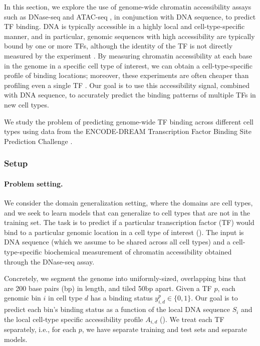 In this section, we explore the use of genome-wide chromatin accessibility assays such as DNase-seq and ATAC-seq \citep{boyle2008high, DNaseLandscape12, ATAC13}, in conjunction with DNA sequence, to predict TF binding.
DNA is typically accessible in a highly local and cell-type-specific manner,
and in particular, genomic sequences with high accessibility are typically bound by one or more TFs, although the identity of the TF is not directly measured by the experiment \citep{lee2004evidence}.
By measuring chromatin accessibility at each base in the genome in a specific cell type of interest, we can obtain a cell-type-specific profile of binding locations; moreover, these experiments are often cheaper than profiling even a single TF \citep{minnoye2021chromatin}.
Our goal is to use this accessibility signal, combined with DNA sequence, to accurately predict the binding patterns of multiple TFs in new cell types.

We study the problem of predicting genome-wide TF binding across different cell types using data from the ENCODE-DREAM Transcription Factor Binding Site Prediction Challenge \citep{EDsynapse}.


\subsubsection{Setup}
\paragraph{Problem setting.}
We consider the domain generalization setting, where the domains are cell types, and we seek to learn models that can generalize to cell types that are not in the training set.
The task is to predict if a particular transcription factor (TF) would bind to a particular genomic location in a cell type of interest ().
The input is DNA sequence (which we assume to be shared across all cell types) and a cell-type-specific biochemical measurement of chromatin accessibility obtained through the DNase-seq assay.

Concretely, we segment the genome into uniformly-sized, overlapping bins that are 200 base pairs (bp) in length, and tiled 50bp apart. Given a TF $p$, each genomic bin $i$ in cell type $d$ has a binding status $y^{p}_{i, d} \in \{0, 1\}$.
Our goal is to predict each bin's binding status as a function of the local DNA sequence $S_i$ and the local cell-type specific accessibility profile $A_{i,d}$ (). We treat each TF separately, i.e., for each $p$, we have separate training and test sets and separate models.

